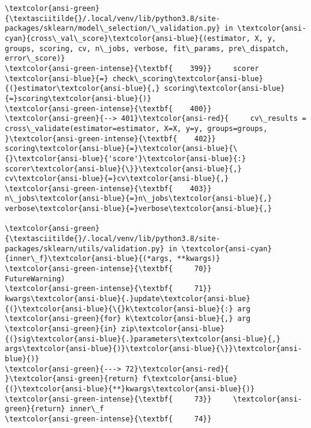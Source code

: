 \documentclass[11pt]{article}
\begin{document}
\begin{Verbatim}[commandchars=\\\{\}, frame=single, framerule=2mm, rulecolor=\color{outerrorbackground}]
\textcolor{ansi-green}{\textasciitilde{}/.local/venv/lib/python3.8/site-packages/sklearn/model\_selection/\_validation.py} in \textcolor{ansi-cyan}{cross\_val\_score}\textcolor{ansi-blue}{(estimator, X, y, groups, scoring, cv, n\_jobs, verbose, fit\_params, pre\_dispatch, error\_score)}
\textcolor{ansi-green-intense}{\textbf{    399}}     scorer \textcolor{ansi-blue}{=} check\_scoring\textcolor{ansi-blue}{(}estimator\textcolor{ansi-blue}{,} scoring\textcolor{ansi-blue}{=}scoring\textcolor{ansi-blue}{)}
\textcolor{ansi-green-intense}{\textbf{    400}} 
\textcolor{ansi-green}{--> 401}\textcolor{ansi-red}{     cv\_results = cross\_validate(estimator=estimator, X=X, y=y, groups=groups,
}\textcolor{ansi-green-intense}{\textbf{    402}}                                 scoring\textcolor{ansi-blue}{=}\textcolor{ansi-blue}{\{}\textcolor{ansi-blue}{'score'}\textcolor{ansi-blue}{:} scorer\textcolor{ansi-blue}{\}}\textcolor{ansi-blue}{,} cv\textcolor{ansi-blue}{=}cv\textcolor{ansi-blue}{,}
\textcolor{ansi-green-intense}{\textbf{    403}}                                 n\_jobs\textcolor{ansi-blue}{=}n\_jobs\textcolor{ansi-blue}{,} verbose\textcolor{ansi-blue}{=}verbose\textcolor{ansi-blue}{,}

\textcolor{ansi-green}{\textasciitilde{}/.local/venv/lib/python3.8/site-packages/sklearn/utils/validation.py} in \textcolor{ansi-cyan}{inner\_f}\textcolor{ansi-blue}{(*args, **kwargs)}
\textcolor{ansi-green-intense}{\textbf{     70}}                           FutureWarning)
\textcolor{ansi-green-intense}{\textbf{     71}}         kwargs\textcolor{ansi-blue}{.}update\textcolor{ansi-blue}{(}\textcolor{ansi-blue}{\{}k\textcolor{ansi-blue}{:} arg \textcolor{ansi-green}{for} k\textcolor{ansi-blue}{,} arg \textcolor{ansi-green}{in} zip\textcolor{ansi-blue}{(}sig\textcolor{ansi-blue}{.}parameters\textcolor{ansi-blue}{,} args\textcolor{ansi-blue}{)}\textcolor{ansi-blue}{\}}\textcolor{ansi-blue}{)}
\textcolor{ansi-green}{---> 72}\textcolor{ansi-red}{         }\textcolor{ansi-green}{return} f\textcolor{ansi-blue}{(}\textcolor{ansi-blue}{**}kwargs\textcolor{ansi-blue}{)}
\textcolor{ansi-green-intense}{\textbf{     73}}     \textcolor{ansi-green}{return} inner\_f
\textcolor{ansi-green-intense}{\textbf{     74}} 


\end{Verbatim}
\end{document}
